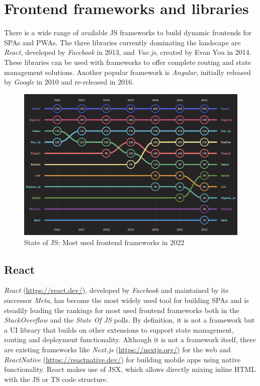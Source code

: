\section{Frontend frameworks and libraries}

There is a wide range of available \ac{JS} frameworks to build dynamic frontends for \ac{SPA}s and \ac{PWA}s. The three libraries currently dominating the landscape are \emph{React}, developed by \emph{Facebook} in 2013, and \emph{Vue.js}, created by Evan You in 2014. These libraries can be used with frameworks to offer complete routing and state management solutions. Another popular framework is \emph{Angular}, initially released by \emph{Google} in 2010 and re-released in 2016.

\begin{figure}[h]
    \centering
    \includegraphics[scale=0.4]{04_Artefakte/01_Abbildungen/stateofjs-usage-frontend-frameworks-2022}
    \caption[Most used frontend frameworks in 2022]{State of JS: Most used frontend frameworks in 2022\protect\footnotemark}
    \label{fig:mostUsedFrameworks}
\end{figure}

\subsection{React}

\emph{React} (\url{https://react.dev/}), developed by \emph{Facebook} and maintained by its successor \emph{Meta}, has become the most widely used tool for building \ac{SPA}s and is steadily leading the rankings for most used frontend frameworks both in the \emph{StackOverflow} \parencite{stackOverflowPollWebFrameworks23} and the \emph{State Of JS} \parencite{mostUsedFrontendFrameworks22} polls. By definition, it is not a framework but a \ac{UI} library that builds on other extensions to support state management, routing and deployment functionality. Although it is not a framework itself, there are existing frameworks like \emph{Next.js} (\url{https://nextjs.org/}) for the web and \emph{ReactNative} (\url{https://reactnative.dev/}) for building mobile apps using native functionality. React makes use of \ac{JSX}, which allows directly mixing inline \ac{HTML} with the \ac{JS} or \ac{TS} code structure.

